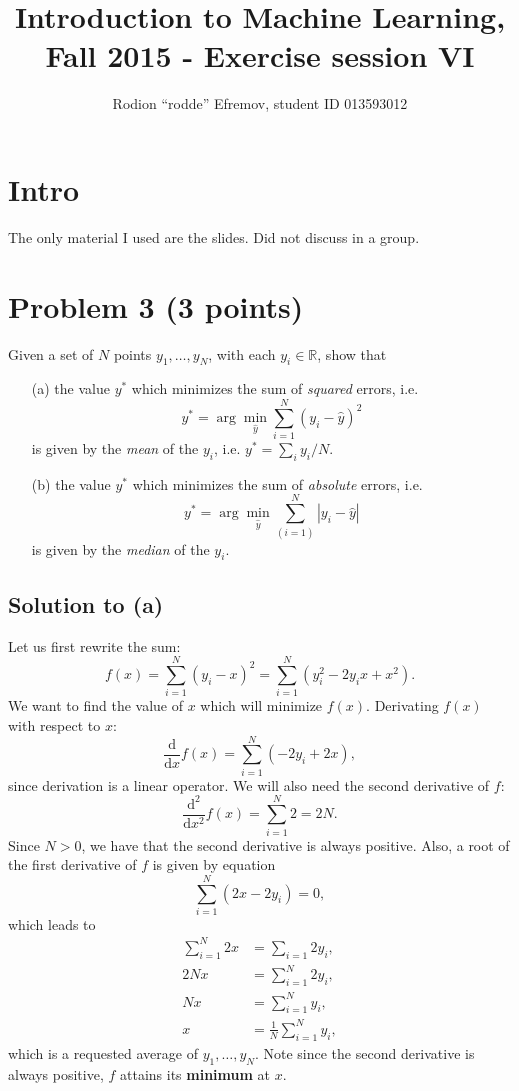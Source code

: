 \documentclass[10pt]{article}
\title{Introduction to Machine Learning, Fall 2015 - Exercise session VI}
\author{Rodion ``rodde'' Efremov, student ID 013593012}
\begin{document}
 \maketitle

\section*{Intro}
The only material I used are the slides. Did not discuss in a group.

\section*{Problem 3 (3 points)}
\color{blue}
Given a set of $N$ points $y_1, \dots, y_N$, with each $y_i \in \mathbb{R}$, show that
\begin{itemize}
\item[(a)] the value $y^{\ast}$ which minimizes the sum of \textit{squared} errors, i.e.
\[
y^{\ast} = \arg \min_{\hat{y}} \sum_{i = 1}^N (y_i - \hat{y})^2
\]
is given by the \textit{mean} of the $y_i$, i.e. $y^{\ast} = \sum_i y_i / N$.
\item[(b)] the value $y^{\ast}$ which minimizes the sum of \textit{absolute} errors, i.e.
\[
y^{\ast} = \arg \min_{\hat{y}} \sum_(i = 1)^N |y_i - \hat{y}|
\]
is given by the \textit{median} of the $y_i$.
\end{itemize}
\color{black}

\subsection*{Solution to (a)}
Let us first rewrite the sum:
\[
f(x) = \sum_{i = 1}^N (y_i - x)^2 = \sum_{i = 1}^N (y_i^2 - 2y_i x + x^2).
\]
We want to find the value of $x$ which will minimize $f(x)$. Derivating $f(x)$ with respect to $x$:
\[
\frac{\mathrm{d}}{\mathrm{d}x}f(x) = \sum_{i = 1}^N (-2y_i + 2x),
\]
since derivation is a linear operator. We will also need the second derivative of $f$:
\[
\frac{\mathrm{d}^2}{\mathrm{d}x^2}f(x) = \sum_{i = 1}^N 2 = 2N.
\]
Since $N > 0$, we have that the second derivative is always positive. Also, a root of the first derivative of $f$ is given by equation
\[
\sum_{i = 1}^N (2x - 2y_i) = 0,
\]
which leads to 
\begin{align*}
\sum_{i = 1}^N 2x &= \sum_{i = 1} 2y_i, \\
2Nx &= \sum_{i = 1}^N 2y_i, \\
Nx &= \sum_{i = 1}^N y_i, \\
x &= \frac{1}{N} \sum_{i = 1}^N y_i,
\end{align*}
which is a requested average of $y_1, \dots, y_N$. Note since the second derivative is always positive, $f$ attains its \textbf{minimum} at $x$.
\end{document}
